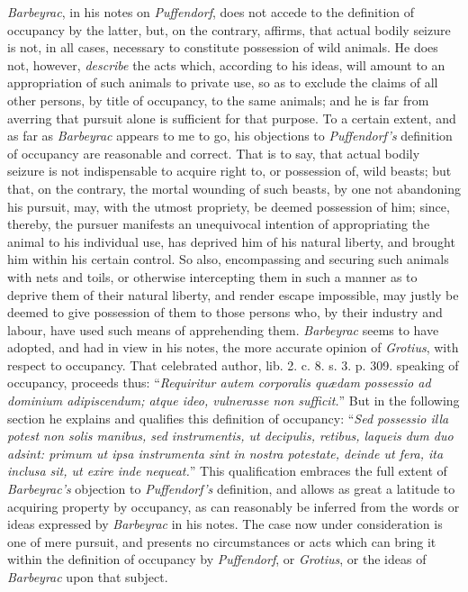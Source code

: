 \textit{Barbeyrac}, in his notes on \textit{Puffendorf}, does not accede to the
definition of occupancy by the latter, but, on the contrary, affirms, that
actual bodily seizure is not, in all cases, necessary to constitute possession
of wild animals. He does not, however, \textit{describe} the acts which,
according to his ideas, will amount to an appropriation of such animals to
private use, so as to exclude the claims of all other persons, by title of
occupancy, to the same animals; and he is far from averring that pursuit alone
is sufficient for that purpose. To a certain extent, and as far as
\textit{Barbeyrac} appears to me to go, his objections to \textit{Puffendorf's}
definition of occupancy are reasonable and correct. That is to say, that actual
bodily seizure is not indispensable to acquire right to, or possession of, wild
beasts; but that, on the contrary, the mortal wounding of such beasts, by one
not abandoning his pursuit, may, with the utmost propriety, be deemed possession
of him; since, thereby, the pursuer manifests an unequivocal intention of
appropriating the animal to his individual use, has deprived him of his natural
liberty, and brought him within his certain control. So also, encompassing and
securing such animals with nets and toils, or otherwise intercepting them in
such a manner as to deprive them of their natural liberty, and render escape
impossible, may justly be deemed to give possession of them to those persons
who, by their industry and labour, have used such means of apprehending them.
\textit{Barbeyrac} seems to have adopted, and had in view in his notes, the more
accurate opinion of \textit{Grotius}, with respect to occupancy. That celebrated
author, lib. 2. c. 8. s. 3. p. 309. speaking of occupancy, proceeds thus:
``\textit{Requiritur autem corporalis qu{\ae}dam possessio ad dominium
adipiscendum; atque ideo, vulnerasse non sufficit.}{}'' But in the following section he
explains and qualifies this definition of occupancy: ``\textit{Sed possessio
illa potest non solis manibus, sed instrumentis, ut decipulis, retibus, laqueis
dum duo adsint: primum ut ipsa instrumenta sint in nostra potestate, deinde ut
fera, ita inclusa sit, ut exire inde nequeat.}'' This qualification embraces the full
extent of \textit{Barbeyrac's} objection to \textit{Puffendorf's} definition,
and allows as great a latitude to acquiring property by occupancy, as can
reasonably be inferred from the words or ideas expressed by \textit{Barbeyrac}
in his notes. The case now under consideration is one of mere pursuit, and
presents no circumstances or acts which can bring it within the definition of
occupancy by \textit{Puffendorf}, or \textit{Grotius}, or the ideas of
\textit{Barbeyrac} upon that subject.

